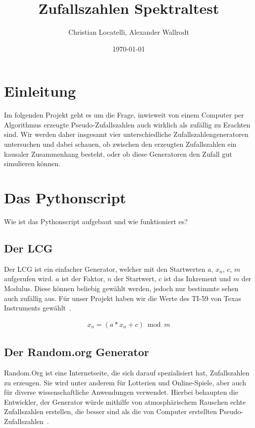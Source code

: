 \documentclass[12pt]{article}
\title{\textbf{Zufallszahlen Spektraltest}}
\author{Christian Locatelli, Alexander Wallrodt}
\date{\today}
\begin{document}
    \maketitle
    \clearpage

    \tableofcontents
    \listoftables
    \listoffigures

    \clearpage

    \section{Einleitung}\label{sec:Einleitung}
    Im folgenden Projekt geht es um die Frage, inwieweit von einem Computer per Algorithmus erzeugte Pseudo-Zufallszahlen
    auch wirklich als zufällig zu Erachten sind.
    Wir werden daher insgesamt vier unterschiedliche Zufallszahlengeneratoren untersuchen und dabei schauen,
    ob zwischen den erzeugten Zufallszahlen ein kausaler Zusammenhang besteht,
    oder ob diese Generatoren den Zufall gut simulieren können.



    \section{Das Pythonscript}\label{sec:das-pythonscript}
    Wie ist das Pythonscript aufgebaut und wie funktioniert es?

    \subsection{Der LCG}\label{subsec:der-lcg}
    Der LCG ist ein einfacher Generator, welcher mit den Startwerten $a$, $x_n$, $c$, $m$ aufgerufen wird.
    $a$ ist der Faktor, $n$ der Startwert, $c$ ist das Inkrement und $m$ der Modulus.
    Diese können beliebig gewählt werden, jedoch nur bestimmte sehen auch zufällig aus.
    Für unser Projekt haben wir die Werte des TI-59 von Texas Instruments gewählt~\cite{lcg}.

    \begin{align*}
    x_n = (a * x_n + c) \bmod m
    \end{align*}

    \subsection{Der Random.org Generator}\label{subsec:der-random.org-generator}
    Random.Org ist eine Internetseite, die sich darauf spezialisiert hat, Zufallszahlen zu erzeugen.
    Sie wird unter anderem für Lotterien und Online-Spiele, aber auch für diverse wissenschaftliche
    Anwendungen verwendet.
    Hierbei behaupten die Entwickler, der Generator würde mithilfe von atmosphärischem
    Rauschen echte Zufallszahlen erstellen, die besser sind als die von Computer erstellten Pseudo-Zufallszahlen~\cite{random-org}.
\end{document}
